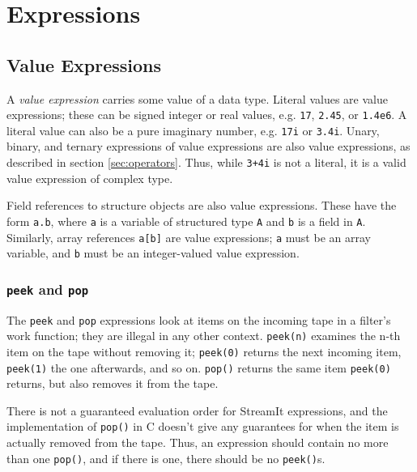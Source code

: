 \documentclass[11pt]{article}
\begin{document}
\section{Expressions}

\subsection{Value Expressions}
\label{sec:expr-value}

A \emph{value expression} carries some value of a data type.  Literal
values are value expressions; these can be signed integer or real
values, e.g. \lstinline|17|, \lstinline|2.45|, or \lstinline|1.4e6|.  A literal value
can also be a pure imaginary number, e.g. \lstinline|17i| or \lstinline|3.4i|.
Unary, binary, and ternary expressions of value expressions are also
value expressions, as described in section \ref{sec:operators}.  Thus,
while \lstinline|3+4i| is not a literal, it is a valid value expression of
complex type.

Field references to structure objects are also value expressions.
These have the form \lstinline|a.b|, where \lstinline|a| is a variable of
structured type \lstinline|A| and \lstinline|b| is a field in \lstinline|A|.
Similarly, array references \lstinline|a[b]| are value expressions;
\lstinline|a| must be an array variable, and \lstinline|b| must be an
integer-valued value expression.

\subsubsection{\lstinline|peek| and \lstinline|pop|}
\label{sec:expr-peek-pop}

The \lstinline|peek| and \lstinline|pop| expressions look at items on
the incoming tape in a filter's work function; they are illegal in any
other context.  \lstinline|peek(n)| examines the n-th item on the tape
without removing it; \lstinline|peek(0)| returns the next incoming
item, \lstinline|peek(1)| the one afterwards, and so on.
\lstinline|pop()| returns the same item \lstinline|peek(0)| returns,
but also removes it from the tape.

\begin{note}
There is not a guaranteed evaluation order for StreamIt expressions,
and the implementation of \lstinline|pop()| in C doesn't give any
guarantees for when the item is actually removed from the tape.  Thus,
an expression should contain no more than one \lstinline|pop()|, and
if there is one, there should be no \lstinline|peek()|s.
\end{note}
\end{document}
